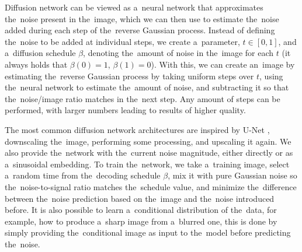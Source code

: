 Diffusion network can be viewed as a~neural network that approximates the~noise present in the~image, which we can then use to estimate the~noise added during each step of the~reverse Gaussian process. Instead of defining the~noise to be added at individual steps, we create a~parameter, $t \in [0, 1]$, and a~diffusion schedule $\beta$, denoting the~amount of noise in the~image for each $t$ (it always holds that $\beta(0) = 1$, $\beta(1)=0$). With this, we can create an~image by estimating the~reverse Gaussian process by taking uniform steps over $t$, using the~neural network to estimate the~amount of noise, and subtracting it so that the~noise/image ratio matches in the~next step. Any amount of steps can be performed, with larger numbers leading to results of higher quality.

The most common diffusion network architectures are inspired by U-Net \citep{u_net}, downscaling the~image, performing some processing, and upscaling it again. We also provide the~network with the~current noise magnitude, either directly or as a~sinusoidal embedding. To train the~network, we take a~training image, select a~random time from the~decoding schedule $\beta$, mix it with pure Gaussian noise so the~noise-to-signal ratio matches the~schedule value, and minimize the~difference between the~noise prediction based on the~image and the~noise introduced before. It is also possible to learn a~conditional distribution of the~data, for example, how to produce a~sharp image from a~blurred one, this is done by simply providing the~conditional image as input to the~model before predicting the~noise.
